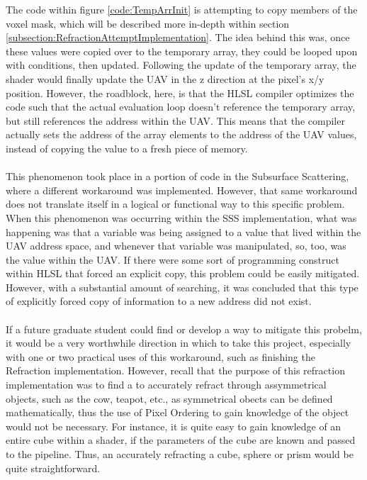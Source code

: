 \documentclass[a4paper, 12pt]{article}
\begin{document}
\noindent The code within figure \ref{code:TempArrInit} is attempting to copy
members of the voxel mask, which will be described more in-depth within
section \ref{subsection:RefractionAttemptImplementation}. The idea behind this was, once
these values were copied over to the temporary array, they could be looped
upon with conditions, then updated. Following the update of the temporary
array, the shader would finally update the UAV in the z direction at the
pixel's x/y position. However, the roadblock, here, is that the HLSL compiler
optimizes the code such that the actual evaluation loop doesn't reference the
temporary array, but still references the address within the UAV. This means
that the compiler actually sets the address of the array elements to the
address of the UAV values, instead of copying the value to a fresh piece of
memory. \\ \\ This phenomenon took place in a portion of code in the
Subsurface Scattering, where a different workaround was implemented. However,
that same workaround does not translate itself in a logical or functional way
to this specific problem. When this phenomenon was occurring within the SSS
implementation, what was happening was that a variable was being assigned to a
value that lived within the UAV address space, and whenever that variable was
manipulated, so, too, was the value within the UAV. If there were some sort of
programming construct within HLSL that forced an explicit copy, this problem
could be easily mitigated. However, with a substantial amount of searching, it
was concluded that this type of explicitly forced copy of information to a new
address did not exist. \\ \\ If a future graduate student could find or
develop a way to mitigate this probelm, it would be a very worthwhile
direction in which to take this project, especially with one or two practical
uses of this workaround, such as finishing the Refraction implementation.
However, recall that the purpose of this refraction implementation was to find
a to accurately refract through assymmetrical objects, such as the cow,
teapot, etc., as symmetrical obects can be defined mathematically, thus the
use of Pixel Ordering to gain knowledge of the object would not be necessary.
For instance, it is quite easy to gain knowledge of an entire cube within a
shader, if the parameters of the cube are known and passed to the pipeline.
Thus, an accurately refracting a cube, sphere or prism would be quite
straightforward.
\end{document}
